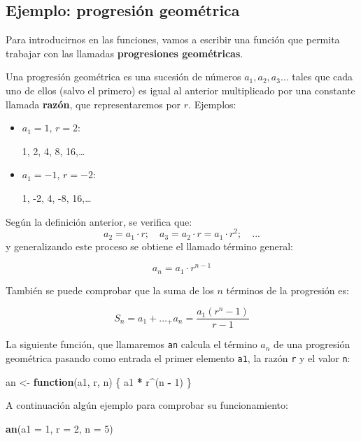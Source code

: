 \documentclass[]{book}
\newenvironment{Shaded}{\begin{snugshade}}{\end{snugshade}}
\newcommand{\KeywordTok}[1]{\textcolor[rgb]{0.13,0.29,0.53}{\textbf{#1}}}
\newcommand{\DataTypeTok}[1]{\textcolor[rgb]{0.13,0.29,0.53}{#1}}
\newcommand{\DecValTok}[1]{\textcolor[rgb]{0.00,0.00,0.81}{#1}}
\newcommand{\StringTok}[1]{\textcolor[rgb]{0.31,0.60,0.02}{#1}}
\newcommand{\ControlFlowTok}[1]{\textcolor[rgb]{0.13,0.29,0.53}{\textbf{#1}}}
\newcommand{\OperatorTok}[1]{\textcolor[rgb]{0.81,0.36,0.00}{\textbf{#1}}}
\newcommand{\NormalTok}[1]{#1}
\begin{document}
\subsection{Ejemplo: progresión
geométrica}\label{ejemplo-progresion-geometrica}

Para introducirnos en las funciones, vamos a escribir una función que
permita trabajar con las llamadas \textbf{progresiones geométricas}.

Una progresión geométrica es una sucesión de números
\(a_1, a_2, a_3\ldots\) tales que cada uno de ellos (salvo el primero)
es igual al anterior multiplicado por una constante llamada
\textbf{razón}, que representaremos por \(r\). Ejemplos:

\begin{itemize}
\item
  \(a_1=1\), \(r=2\):

  1, 2, 4, 8, 16,\ldots{}
\item
  \(a_1=-1\), \(r=-2\):

  1, -2, 4, -8, 16,\ldots{}
\end{itemize}

Según la definición anterior, se verifica que:
\[a_2=a_1\cdot r; \quad a_3=a_2\cdot r=a_1\cdot r^2; \quad ...\] y
generalizando este proceso se obtiene el llamado término general:

\[a_n=a_1\cdot r^{n-1}\]

También se puede comprobar que la suma de los \(n\) términos de la
progresión es:

\[S_n=a_1+\ldots_+a_n=\frac{a_1(r^n-1)}{r-1}\]

La siguiente función, que llamaremos \texttt{an} calcula el término
\(a_n\) de una progresión geométrica pasando como entrada el primer
elemento \texttt{a1}, la razón \texttt{r} y el valor \texttt{n}:

\begin{Shaded}
\begin{Highlighting}[]
\NormalTok{an <-}\StringTok{ }\ControlFlowTok{function}\NormalTok{(a1, r, n) \{}
\NormalTok{        a1 }\OperatorTok{*}\StringTok{ }\NormalTok{r}\OperatorTok{^}\NormalTok{(n }\OperatorTok{-}\StringTok{ }\DecValTok{1}\NormalTok{)}
\NormalTok{      \}}
\end{Highlighting}
\end{Shaded}

A continuación algún ejemplo para comprobar su funcionamiento:

\begin{Shaded}
\begin{Highlighting}[]
\KeywordTok{an}\NormalTok{(}\DataTypeTok{a1 =} \DecValTok{1}\NormalTok{, }\DataTypeTok{r =} \DecValTok{2}\NormalTok{, }\DataTypeTok{n =} \DecValTok{5}\NormalTok{)}
\end{Highlighting}
\end{Shaded}
\end{document}
